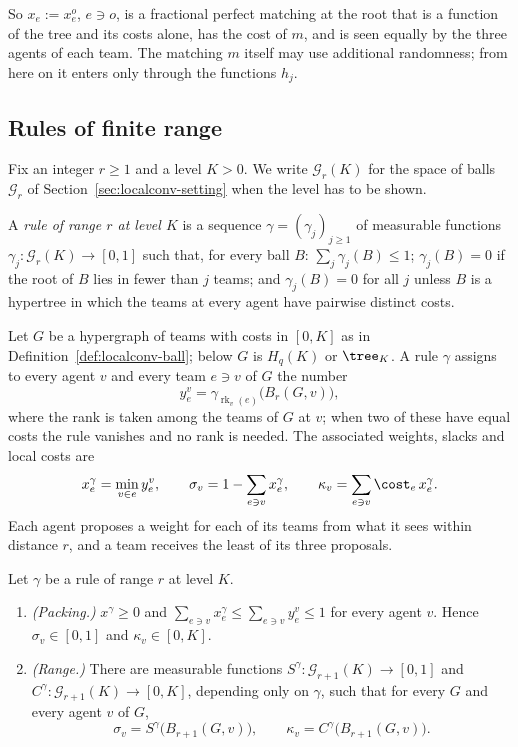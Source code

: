 So $x_e:=x^o_e$, $e\ni o$, is a fractional perfect matching at the root that is a function
of the tree and its costs alone, has the cost of $m$, and is seen equally by the three
agents of each team. The matching $m$ itself may use additional randomness; from here on it
enters only through the functions $h_j$.

\subsection{Rules of finite range}\label{sec:lp-rules}

Fix an integer $r\ge1$ and a level $K>0$. We write $\mathcal G_r(K)$ for the space of balls
$\mathcal G_r$ of Section~\ref{sec:localconv-setting} when the level has to be shown.

\begin{definition}\label{def:lp-rule}
A \emph{rule of range $r$ at level $K$} is a sequence $\gamma=(\gamma_j)_{j\ge1}$ of
measurable functions $\gamma_j\colon\mathcal G_r(K)\to[0,1]$ such that, for every ball $B$:
$\sum_j\gamma_j(B)\le1$; $\gamma_j(B)=0$ if the root of $B$ lies in fewer than $j$ teams;
and $\gamma_j(B)=0$ for all $j$ unless $B$ is a hypertree in which the teams at every agent
have pairwise distinct costs.
\end{definition}

Let $G$ be a hypergraph of teams with costs in $[0,K]$ as in
Definition~\ref{def:localconv-ball}; below $G$ is $H_q(K)$ or $\tree_K$. A rule $\gamma$
assigns to every agent $v$ and every team $e\ni v$ of $G$ the number
\begin{equation}\label{eq:lp-y}
y^v_e=\gamma_{\operatorname{rk}_v(e)}\bigl(B_r(G,v)\bigr),
\end{equation}
where the rank is taken among the teams of $G$ at $v$; when two of these have equal costs
the rule vanishes and no rank is needed. The associated weights, slacks and local costs are
\begin{equation}\label{eq:lp-minpacking}
x^\gamma_e=\min_{v\in e}y^v_e,\qquad
\sigma_v=1-\sum_{e\ni v}x^\gamma_e,\qquad
\kappa_v=\sum_{e\ni v}\cost_e\,x^\gamma_e .
\end{equation}
Each agent proposes a weight for each of its teams from what it sees within distance $r$,
and a team receives the least of its three proposals.

\begin{lemma}\label{lem:lp-rule}
Let $\gamma$ be a rule of range $r$ at level $K$.
\begin{enumerate}
\item[\textup{(a)}] \emph{(Packing.)} $x^\gamma\ge0$ and
$\sum_{e\ni v}x^\gamma_e\le\sum_{e\ni v}y^v_e\le1$ for every agent $v$. Hence
$\sigma_v\in[0,1]$ and $\kappa_v\in[0,K]$.
\item[\textup{(b)}] \emph{(Range.)} There are measurable functions
$S^\gamma\colon\mathcal G_{r+1}(K)\to[0,1]$ and $C^\gamma\colon\mathcal G_{r+1}(K)\to[0,K]$,
depending only on $\gamma$, such that for every $G$ and every agent $v$ of $G$,
\[
\sigma_v=S^\gamma\bigl(B_{r+1}(G,v)\bigr),\qquad\kappa_v=C^\gamma\bigl(B_{r+1}(G,v)\bigr).
\]
\end{enumerate}
\end{lemma}

